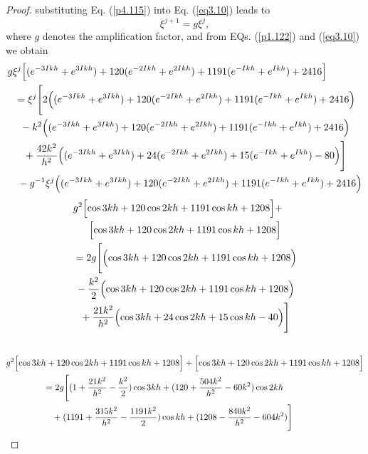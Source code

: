 \documentclass[10pt,letterpaper,twoside]{article}
\begin{document}
\begin{proof}
substituting Eq. (\ref{p4.115}) into Eq. (\ref{eq3.10}) leads to
\begin{equation}
  \xi ^{j+1}=g\xi ^{j},  \label{p1.122}
\end{equation}
where $g$ denotes the amplification factor, and from EQs. (\ref{p1.122}) and (\ref{eq3.10}) we obtain
\begin{equation}
  \begin{multlined}
   g\xi^{j} \Bigl[(e^{-3Ikh} + e^{3Ikh}) + 120(e^{-2Ikh} + e^{2Ikh}) + 1191(e^{-Ikh} + e^{Ikh}) + 2416 \Bigr] \\
   = \xi^{j} \Biggl[2 \Bigl( (e^{-3Ikh} + e^{3Ikh}) + 120(e^{-2Ikh} + e^{2Ikh}) + 1191(e^{-Ikh} + e^{Ikh}) + 2416 \Bigr) \\
   -k^2\Bigl((e^{-3Ikh} + e^{3Ikh}) + 120(e^{-2Ikh} + e^{2Ikh}) + 1191(e^{-Ikh} + e^{Ikh}) + 2416 \Bigr) \\
   + \frac{42k^{2}}{h^{2}} \Bigl( (e^{-3Ikh} + e^{3Ikh}) + 24(e^{-2Ikh} + e^{2Ikh}) + 15(e^{-Ikh} + e^{Ikh}) - 80 \Bigr) \Biggr]\\
   -g^{-1}\xi^{j} \Bigl((e^{-3Ikh} + e^{3Ikh}) + 120(e^{-2Ikh} + e^{2Ikh}) + 1191(e^{-Ikh} + e^{Ikh}) + 2416 \Bigr)
  \end{multlined}
 \end{equation}
  \begin{equation}\label{p2.18}
  \begin{multlined} 
   g^{2} \Bigl[ \cos 3kh + 120\cos 2kh + 1191\cos kh + 1208 \Bigr] + \\
   \Bigl[ \cos 3kh + 120\cos 2kh + 1191\cos kh + 1208 \Bigr] \\
   =2g \Biggl[ \Bigl(\cos 3kh + 120\cos 2kh + 1191\cos kh + 1208 \Bigr) \\
   -\frac{k^{2}}{2}\Bigl(\cos 3kh + 120\cos 2kh + 1191\cos kh + 1208 \Bigr) \\
   + \frac{21k^{2}}{h^{2}} \Bigl( \cos 3kh + 24\cos 2kh + 15\cos kh - 40 \Bigr) \Biggr]\\
  \end{multlined}
 \end{equation}
 \begin{equation}\label{p2.19}
  \begin{aligned}
   &g^{2} \Bigl[ \cos 3kh + 120\cos 2kh + 1191\cos kh + 1208 \Bigr] +
   \Bigl[ \cos 3kh + 120\cos 2kh + 1191\cos kh + 1208 \Bigr] \\
  &\hspace{1.5cm}= 2g \Biggl[
   (1+\frac{21k^{2}}{h^{2}}-\frac{k^{2}}{2}) \cos 3kh + 
   (120+\frac{504k^{2}}{h^{2}}-60k^{2}) \cos 2kh \\
   & \hspace{1.5cm}\quad + (1191+\frac{315k^{2}}{h^{2}}-\frac{1191k^{2}}{2}) \cos kh + 
   (1208-\frac{840k^{2}}{h^{2}}-604k^{2})
   \Biggr]
  \end{aligned}
 \end{equation}
 

\end{proof}
\end{document}

